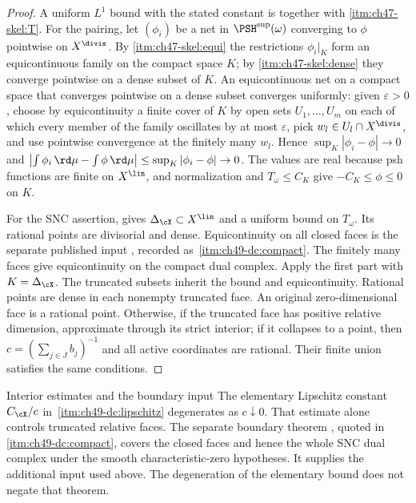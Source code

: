 \begin{proof}
A uniform $L^1$ bound with the stated constant is
 together with \cref{itm:ch47-skel:T}.  For the
pairing, let $(\phi_i)$ be a net in $\PSH^{\sup}(\omega)$ converging to
$\phi$ pointwise on $X^{\divis}$.  By \cref{itm:ch47-skel:equi} the
restrictions $\phi_i|_K$ form an equicontinuous family on the compact
space $K$; by \cref{itm:ch47-skel:dense} they converge pointwise on a
dense subset of $K$.  An equicontinuous net on a compact space that
converges pointwise on a dense subset converges uniformly: given
$\varepsilon>0$, choose by equicontinuity a finite cover of $K$ by open
sets $U_1,\dots,U_m$ on each of which every member of the family
oscillates by at most $\varepsilon$, pick $w_l\in U_l\cap X^{\divis}$,
and use pointwise convergence at the finitely many $w_l$.  Hence
$\sup_K|\phi_i-\phi|\to0$ and
$\bigl|\int\phi_i\,\rd\mu-\int\phi\,\rd\mu\bigr|\le\sup_K|\phi_i-\phi|
\to0$.  The values are real because psh functions are finite on $X^{\lin}$,
and normalization and $T_\omega\le C_K$ give $-C_K\le\phi\le0$ on $K$.

For the SNC assertion,  gives
$\Delta_{\cX}\subset X^{\lin}$ and a uniform bound on $T_\omega$.
Its rational points are divisorial and dense. Equicontinuity on all
closed faces is the separate published input
\cite[Theorem~A.4]{BJ22}, recorded as
\,\cref{itm:ch49-dc:compact}.
The finitely many faces give equicontinuity on the compact dual
complex. Apply the first part with $K=\Delta_{\cX}$.
The truncated subsets inherit the bound and equicontinuity.
Rational points are dense in each nonempty truncated face.
An original zero-dimensional face is a rational point. Otherwise,
if the truncated face has positive relative dimension, approximate
through its strict interior; if it collapses to a point, then
$c=(\sum_{j\in J}b_j)^{-1}$ and all active coordinates are rational.
Their finite union satisfies the same conditions.
\end{proof}

\begin{warning}{Interior estimates and the boundary input}
\label{warn:ch47-skeletal-boundary}
The elementary Lipschitz constant $C_{\cX}/c$ in
\,\cref{itm:ch49-dc:lipschitz}
degenerates as $c\downarrow0$. That estimate alone controls
truncated relative faces. The separate boundary theorem
\cite[Theorem~A.4]{BJ22}, quoted in
\cref{itm:ch49-dc:compact}, covers the closed faces and hence
the whole SNC dual complex under the smooth characteristic-zero
hypotheses. It supplies the additional input used above.
The degeneration of the elementary bound does not negate that theorem.
\end{warning}

